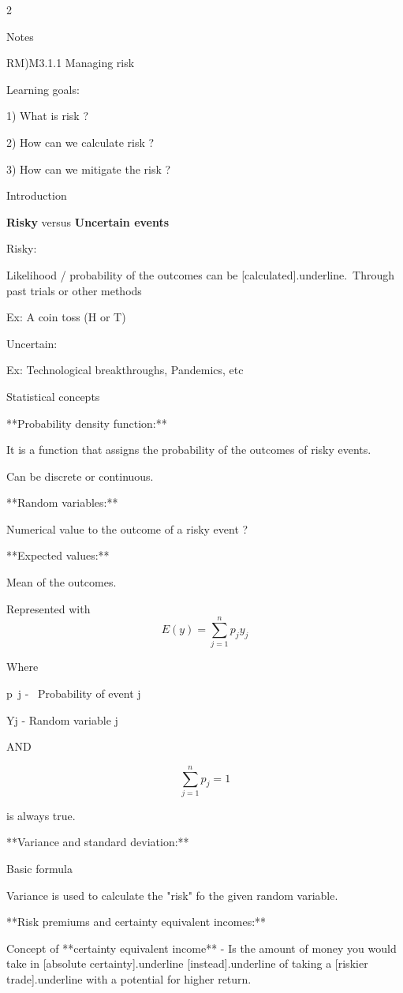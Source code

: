 \documentclass{article}
\begin{document}
\begin{multicols}{2}


    
Notes

RM)M3.1.1 Managing risk

Learning goals:

1)  What is risk ?

2)  How can we calculate risk ?

3)  How can we mitigate the risk ?

Introduction

\textbf{Risky} versus \textbf{Uncertain events}

Risky:

Likelihood / probability of the outcomes can be [calculated]{.underline}.\
Through past trials or other methods

Ex: A coin toss (H or T)

Uncertain:


Ex: Technological breakthroughs, Pandemics, etc

Statistical concepts

**Probability density function:**

It is a function that assigns the probability of the outcomes of risky events.

Can be discrete or continuous.

**Random variables:**

Numerical value to the outcome of a risky event ?

**Expected values:**

Mean of the outcomes.

Represented with$$
E(y)=\sum_{j=1}^n p_j y_j 
$$

Where

\space p~j -~ Probability of event j

\space Yj - Random variable j

AND

$$
\sum_{j=1}^n p_j = 1$$

is always true.

**Variance and standard deviation:**

Basic formula


Variance is used to calculate the "risk" fo the given random variable.

**Risk premiums and certainty equivalent incomes:**

Concept of **certainty equivalent income** - Is the amount of money you would take in [absolute certainty]{.underline} [instead]{.underline} of taking a [riskier trade]{.underline} with a potential for higher return.


\end{multicols}
\end{document}

